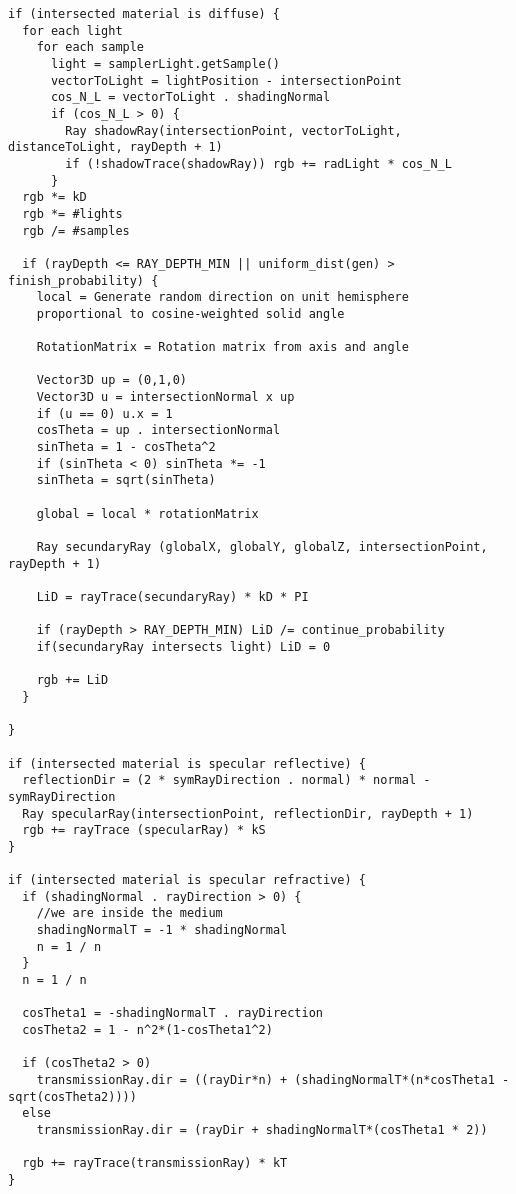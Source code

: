 \begin{lstlisting}
if (intersected material is diffuse) {
  for each light
    for each sample
      light = samplerLight.getSample()
      vectorToLight = lightPosition - intersectionPoint
      cos_N_L = vectorToLight . shadingNormal
      if (cos_N_L > 0) {
        Ray shadowRay(intersectionPoint, vectorToLight, distanceToLight, rayDepth + 1)
        if (!shadowTrace(shadowRay)) rgb += radLight * cos_N_L
      }
  rgb *= kD
  rgb *= #lights
  rgb /= #samples

  if (rayDepth <= RAY_DEPTH_MIN || uniform_dist(gen) > finish_probability) {
    local = Generate random direction on unit hemisphere 
    proportional to cosine-weighted solid angle

    RotationMatrix = Rotation matrix from axis and angle

    Vector3D up = (0,1,0)
    Vector3D u = intersectionNormal x up
    if (u == 0) u.x = 1
    cosTheta = up . intersectionNormal
    sinTheta = 1 - cosTheta^2
    if (sinTheta < 0) sinTheta *= -1
    sinTheta = sqrt(sinTheta)

    global = local * rotationMatrix

    Ray secundaryRay (globalX, globalY, globalZ, intersectionPoint, rayDepth + 1)

    LiD = rayTrace(secundaryRay) * kD * PI

    if (rayDepth > RAY_DEPTH_MIN) LiD /= continue_probability
    if(secundaryRay intersects light) LiD = 0

    rgb += LiD
  }

}

if (intersected material is specular reflective) {
  reflectionDir = (2 * symRayDirection . normal) * normal - symRayDirection
  Ray specularRay(intersectionPoint, reflectionDir, rayDepth + 1)
  rgb += rayTrace (specularRay) * kS
}

if (intersected material is specular refractive) {
  if (shadingNormal . rayDirection > 0) {
    //we are inside the medium
    shadingNormalT = -1 * shadingNormal
    n = 1 / n
  }
  n = 1 / n

  cosTheta1 = -shadingNormalT . rayDirection
  cosTheta2 = 1 - n^2*(1-cosTheta1^2)

  if (cosTheta2 > 0)
    transmissionRay.dir = ((rayDir*n) + (shadingNormalT*(n*cosTheta1 - sqrt(cosTheta2))))
  else
    transmissionRay.dir = (rayDir + shadingNormalT*(cosTheta1 * 2))

  rgb += rayTrace(transmissionRay) * kT
}
\end{lstlisting}

